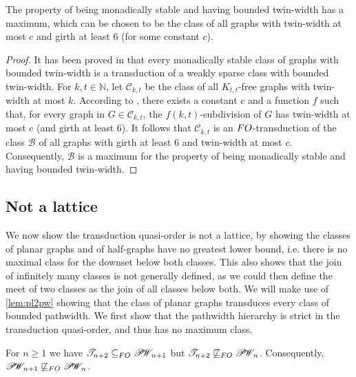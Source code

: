\documentclass{lmcs}
\newcommand{\Cc}{\mathscr{C}}
\newcommand{\PW}{\mathscr{P\!W\!}}
\newcommand{\Tt}{\mathscr{T}}
\renewcommand{\FO}{{\rm FO}}
\theoremstyle{definition}
\begin{document}
\begin{thm}
		\label{thm:max_sparse_TWW}
	The property of being monadically stable and having bounded twin-width  has a maximum, which can be chosen to be the class of all graphs with twin-width at most $c$ and girth at least $6$ (for some constant $c$).
\end{thm}
\begin{proof}
	It has been proved in \cite{gajarsky2022stable} that every monadically stable class of graphs with bounded twin-width is a transduction of a weakly sparse class with bounded twin-width.
	For $k,t\in\mathbb N$, let $\Cc_{k,t}$ be the class of all $K_{t,t}$-free graphs with twin-width at most $k$.
	According to \cite[Theorem~1.4]{TWW-factor},  there exists a constant $c$ and a function $f$ such that, for every graph in $G\in \Cc_{k,t}$, the $f(k,t)$-subdivision of $G$ has twin-width at most $c$ (and girth at least $6$). It follows that $\Cc_{k,t}$ is an $\FO$-transduction of the class $\mathscr B$ of all graphs with girth at least $6$ and twin-width at most $c$. Consequently, $\mathscr B$ is a maximum for the property of being monadically stable and having bounded twin-width.
\end{proof}

\subsection{Not a lattice}

We now show the transduction quasi-order is not a lattice, by showing the classes of planar graphs and of half-graphs have no greatest lower bound, i.e. there is no maximal class for the downset below both classes. This also shows that the join of infinitely many classes is not generally defined, as we could then define the meet of two classes as the join of all classes below both. We will make use of \cref{lem:pl2pw} showing that the class of planar graphs transduces every class of bounded pathwidth. We first show that the pathwidth hierarchy is strict in the transduction quasi-order, and thus has no maximum class.

\begin{thm}
	\label{thm:PW}
	For $n\geq 1$ we have $\Tt_{n+2}\subseteq_\FO\PW_{n+1}$ but
	\mbox{$\Tt_{n+2}\not\sqsubseteq_\FO\PW_n$}.
	  Consequently, $\PW_{n+1}\not\sqsubseteq_\FO \PW_{n}$.
\end{thm}
\end{document}
